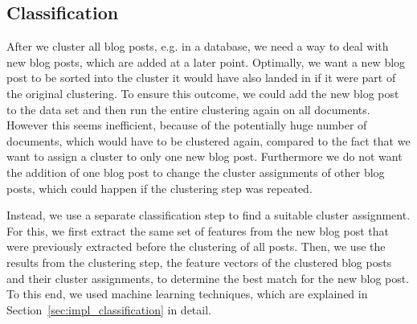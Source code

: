 
\subsection{Classification}
\label{sec:classification}



After we cluster all blog posts, e.g. in a database, we need a way to deal with new blog posts, which are added at a later point.
Optimally, we want a new blog post to be sorted into the cluster it would have also landed in if it were part of the original clustering.
To ensure this outcome, we could add the new blog post to the data set and then run the entire clustering again on all documents.
However this seems inefficient, because of the potentially huge number of documents, which would have to be clustered again, compared to the fact that we want to assign a cluster to only one new blog post.
Furthermore we do not want the addition of one blog post to change the cluster assignments of other blog posts, which could happen if the clustering step was repeated.


Instead, we use a separate classification step to find a suitable cluster assignment.
For this, we first extract the same set of features from the new blog post that were previously extracted before the clustering of all posts.
Then, we use the results from the clustering step, the feature vectors of the clustered blog posts and their cluster assignments, to determine the best match for the new blog post.
To this end, we used machine learning techniques, which are explained in Section~\ref{sec:impl_classification} in detail.
